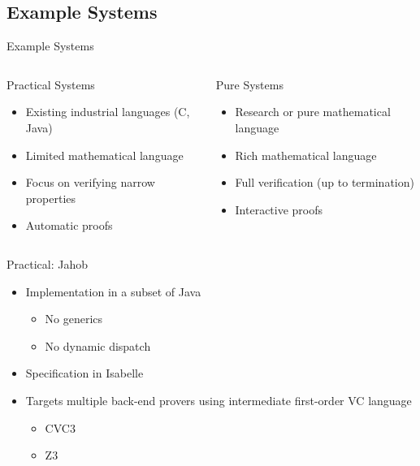 \documentclass{beamer}
\begin{document}
\subsection{Example Systems}
\begin{frame}{Example Systems}
	\begin{columns}
	\begin{column}[l]{5cm}
		Practical Systems
		\begin{itemize}
			\item Existing industrial languages (C, Java)
			\item Limited mathematical language
			\item Focus on verifying narrow properties
			\item Automatic proofs
		\end{itemize}
	\end{column}
	\begin{column}[r]{5cm}
		Pure Systems
		\begin{itemize}
			\item Research or pure mathematical language
			\item Rich mathematical language
			\item Full verification (up to termination)
			\item Interactive proofs
		\end{itemize}
	\end{column}
	\end{columns}
\end{frame}

\begin{frame}{Practical: Jahob}
	\begin{itemize}
		\item Implementation in a subset of Java
		\begin{itemize}
			\item No generics
			\item No dynamic dispatch
		\end{itemize}
		\item Specification in Isabelle
		\item Targets multiple back-end provers using intermediate first-order VC language
		\begin{itemize}
			\item CVC3
			\item Z3
		\end{itemize}
	\end{itemize}
\end{frame}
\end{document}
